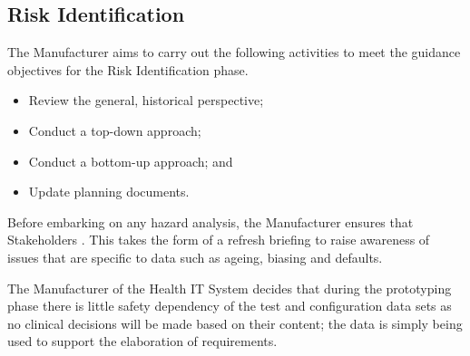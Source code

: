 \subsection{Risk Identification}
\begin{minipage}[t]{0.73\textwidth}
  The Manufacturer aims to carry out the following activities to meet the guidance objectives for the Risk Identification phase.
  \begin{itemize}
    \item Review the general, historical perspective;
    \item Conduct a top-down approach;
    \item Conduct a bottom-up approach; and
    \item Update planning documents.
  \end{itemize}
\end{minipage}
\begin{minipage}[t]{0.25\textwidth}
  \centering{}
\end{minipage}

Before embarking on any hazard analysis, the Manufacturer ensures that Stakeholders . This takes the form of a refresh briefing to raise awareness of issues that are specific to data such as ageing, biasing and defaults.

The Manufacturer of the Health IT System decides that during the prototyping phase there is little safety dependency of the test and configuration data sets as no clinical decisions will be made based on their content; the data is simply being used to support the elaboration of requirements.

